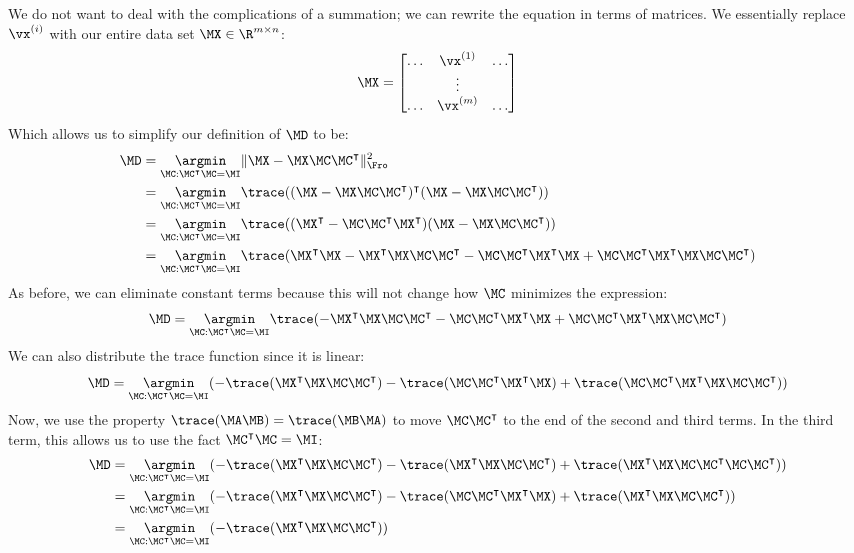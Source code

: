 We do not want to deal with the complications of a summation; we can rewrite the equation in terms of matrices.  We essentially replace $\vx^{(i)}$ with our entire data set $\MX \in \R^{m \times n}$:
$$\MX = \begin{bmatrix} \ldots & \vx^{(1)} & \ldots\\ & \vdots &\\ \ldots & \vx^{(m)} & \ldots \end{bmatrix}$$
Which allows us to simplify our definition of $\MD$ to be: 
\begin{align*}
    \MD &= \underset{\MC : \MC^\intercal\MC = \MI}{\argmin} \|\MX - \MX\MC\MC^\intercal\|^2_\Fro\\
&= \underset{\MC : \MC^\intercal\MC = \MI}{\argmin} \trace((\MX - \MX\MC\MC^\intercal)^\intercal(\MX - \MX\MC\MC^\intercal))\\
&= \underset{\MC : \MC^\intercal\MC = \MI}{\argmin} \trace((\MX^\intercal - \MC\MC^\intercal\MX^\intercal)(\MX - \MX\MC\MC^\intercal))\\
&= \underset{\MC : \MC^\intercal\MC = \MI}{\argmin} \trace(\MX^\intercal\MX - \MX^\intercal\MX\MC\MC^\intercal - \MC\MC^\intercal\MX^\intercal\MX + \MC\MC^\intercal\MX^\intercal\MX\MC\MC^\intercal)
\end{align*}
As before, we can eliminate constant terms because this will not change how $\MC$ minimizes the expression:
$$\MD = \underset{\MC : \MC^\intercal\MC = \MI}{\argmin} \trace(-\MX^\intercal\MX\MC\MC^\intercal - \MC\MC^\intercal\MX^\intercal\MX + \MC\MC^\intercal\MX^\intercal\MX\MC\MC^\intercal)$$
We can also distribute the trace function since it is linear:
$$\MD = \underset{\MC : \MC^\intercal\MC = \MI}{\argmin} (-\trace(\MX^\intercal\MX\MC\MC^\intercal) - \trace(\MC\MC^\intercal\MX^\intercal\MX) + \trace(\MC\MC^\intercal\MX^\intercal\MX\MC\MC^\intercal))$$
Now, we use the property $\trace(\MA\MB) = \trace(\MB\MA)$ to move $\MC\MC^\intercal$ to the end of the second and third terms.  In the third term, this allows us to use the fact $\MC^\intercal\MC = \MI$:
\begin{align*}
    \MD &= \underset{\MC : \MC^\intercal\MC = \MI}{\argmin} (-\trace(\MX^\intercal\MX\MC\MC^\intercal) - \trace(\MX^\intercal\MX\MC\MC^\intercal) + \trace(\MX^\intercal\MX\MC\MC^\intercal\MC\MC^\intercal))\\
&= \underset{\MC : \MC^\intercal\MC = \MI}{\argmin} (-\trace(\MX^\intercal\MX\MC\MC^\intercal) - \trace(\MC\MC^\intercal\MX^\intercal\MX) + \trace(\MX^\intercal\MX\MC\MC^\intercal))\\
&= \underset{\MC : \MC^\intercal\MC = \MI}{\argmin} (-\trace(\MX^\intercal\MX\MC\MC^\intercal))
\end{align*}
